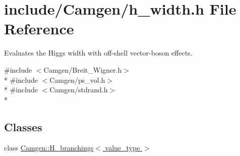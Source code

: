 \hypertarget{a00636}{\section{include/\-Camgen/h\-\_\-width.h File Reference}
\label{a00636}
}


Evaluates the Higgs width with off-\/shell vector-\/boson effects.  


{\ttfamily \#include $<$Camgen/\-Breit\-\_\-\-Wigner.\-h$>$}\\*
{\ttfamily \#include $<$Camgen/ps\-\_\-vol.\-h$>$}\\*
{\ttfamily \#include $<$Camgen/stdrand.\-h$>$}\\*
\subsection*{Classes}
\begin{DoxyCompactItemize}
\item 
class \hyperlink{a00253}{Camgen\-::\-H\-\_\-branchings$<$ value\-\_\-type $>$}
\end{DoxyCompactItemize}
